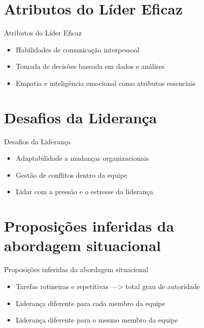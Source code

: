 \documentclass[aspectratio=169,xcolor=dvipsnames]{beamer}
\begin{document}
\section{Atributos do Líder Eficaz}

\begin{frame}{Atributos do Líder Eficaz}
	\begin{itemize}
		\item Habilidades de comunicação interpessoal
		\item Tomada de decisões baseada em dados e análises
		\item Empatia e inteligência emocional como atributos essenciais

	\end{itemize}
\end{frame}

\section{Desafios da Liderança}

\begin{frame}{Desafios da Liderança}
	\begin{itemize}
		\item Adaptabilidade a mudanças organizacionais
		\item Gestão de conflitos dentro da equipe
		\item Lidar com a pressão e o estresse da liderança

	\end{itemize}
\end{frame}

\section{Proposições inferidas da abordagem situacional}

\begin{frame}{Proposições inferidas da abordagem situacional}
	\begin{itemize}
		\item Tarefas rotineiras e repetitivas ---> total grau de autoridade
		\item Liderança diferente para cada membro da equipe
		\item Liderança diferente para o mesmo membro da equipe
	\end{itemize}
\end{frame}
\end{document}
